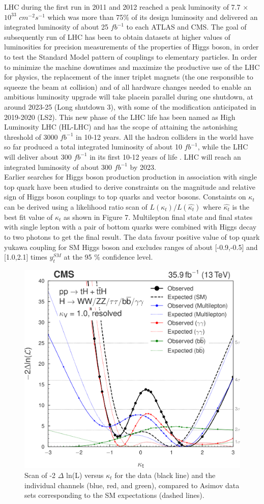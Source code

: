 \documentclass[final,3p]{CSP}
\begin{document}
 LHC during the first run in 2011 and 2012 reached a peak luminosity of 7.7 $\times$ $10^{33}$ $cm^{-2}s^{-1}$ which was more than 75$\%$ of its design luminosity and delivered an integrated luminosity of about 25 $fb^{-1}$ to each ATLAS and CMS. The goal of subsequently run of LHC has been to obtain datasets at higher values of luminosities for precision measurements of the properties of Higgs boson, in order to test the Standard Model pattern of couplings to elementary particles. In order to minimize the machine downtimes and maximize the productive use of the LHC for physics, the replacement of the inner triplet magnets (the one responsible to squeeze the beam at collision) and  of  all  hardware  changes  needed  to  enable  an  ambitious  luminosity  upgrade  will  take  placein parallel during one shutdown, at around 2023-25 (Long shutdown 3), with some of the modification anticipated in 2019-2020 (LS2). This new phase of the LHC life has been named as High Luminosity LHC (HL-LHC) and has the scope of attaining the astonishing threshold of 3000 $fb^{-1}$ in 10-12 years. All the hadron colliders in the world have so far produced a total integrated luminosity of about 10 $fb^{-1}$, while the LHC will deliver about 300 $fb^{-1}$ in its first 10-12 years of life \cite{collaborations2019report}. LHC will reach an integrated luminosity of about 300 $fb^{-1}$ by 2023. \\
 
 
 Earlier searches for Higgs boson production production in association with single top quark have been studied to derive constraints on the magnitude and relative sign of Higgs boson couplings to top quarks and vector bosons. Constaints on $\kappa_t$ can be derived using a likelihood ratio scan of $L(\kappa_t)/L(\hat{\kappa_t})$ where $\hat{\kappa_t}$ is the best fit value of $\kappa_t$ as shown in Figure 7. Multilepton final state and final states with single lepton with a pair of bottom quarks were combined with Higgs decay to two photons to get the final result. The data favour positive value of top quark yukawa coupling for SM Higgs boson and excludes ranges of about [-0.9,-0.5] and [1.0,2.1] times $y^{SM}_t$ at the 95 $\%$ confidence level.

 \begin{figure}[H]
  \centering
   \includegraphics[width=0.5 \columnwidth]{./cms13.png}
  \caption{Scan of -2 $\Delta$ ln(L) versus $\kappa_t$ for the data (black line) and the individual channels (blue, red, and green), compared to Asimov data sets corresponding to the SM expectations (dashed lines).}
   \label{figure 7}
\end{figure}
\end{document}
